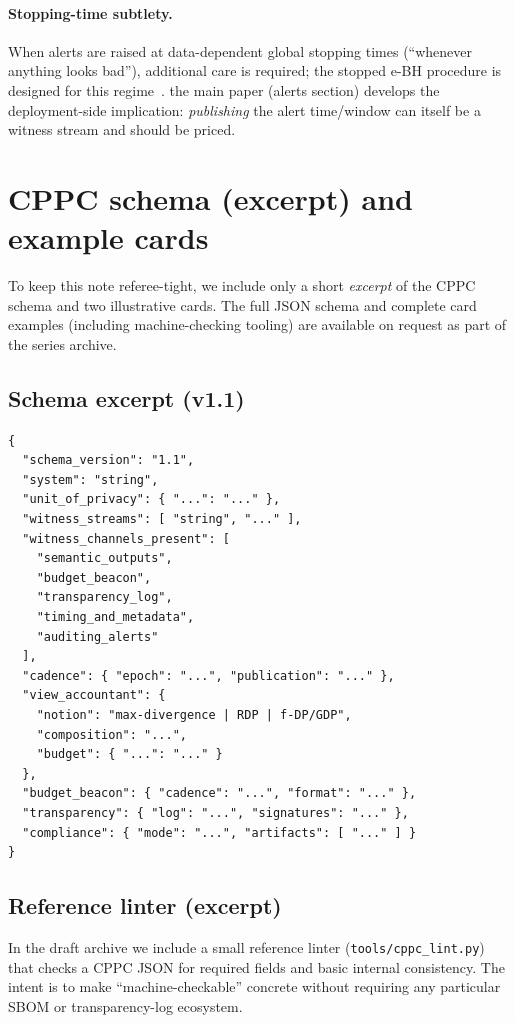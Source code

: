 \documentclass[11pt]{article}
\theoremstyle{definition}
\theoremstyle{remark}
\begin{document}
\paragraph{Stopping-time subtlety.}
When alerts are raised at data-dependent global stopping times (``whenever anything looks bad''), additional care is required; the stopped e-BH procedure is designed for this regime~\cite{wang2025sebH}.
the main paper (alerts section) develops the deployment-side implication: \emph{publishing} the alert time/window can itself be a witness stream and should be priced.



\section{CPPC schema (excerpt) and example cards}
\label{app:cppc}
To keep this note referee-tight, we include only a short \emph{excerpt} of the CPPC schema and two illustrative cards.
The full JSON schema and complete card examples (including machine-checking tooling) are available on request as part of the series archive.

\subsection{Schema excerpt (v1.1)}
\begin{lstlisting}
{
  "schema_version": "1.1",
  "system": "string",
  "unit_of_privacy": { "...": "..." },
  "witness_streams": [ "string", "..." ],
  "witness_channels_present": [
    "semantic_outputs",
    "budget_beacon",
    "transparency_log",
    "timing_and_metadata",
    "auditing_alerts"
  ],
  "cadence": { "epoch": "...", "publication": "..." },
  "view_accountant": {
    "notion": "max-divergence | RDP | f-DP/GDP",
    "composition": "...",
    "budget": { "...": "..." }
  },
  "budget_beacon": { "cadence": "...", "format": "..." },
  "transparency": { "log": "...", "signatures": "..." },
  "compliance": { "mode": "...", "artifacts": [ "..." ] }
}
\end{lstlisting}

\subsection{Reference linter (excerpt)}
In the draft archive we include a small reference linter (\texttt{tools/cppc\_lint.py}) that checks a CPPC JSON for required fields and basic internal consistency.
The intent is to make ``machine-checkable'' concrete without requiring any particular SBOM or transparency-log ecosystem.
\end{document}
